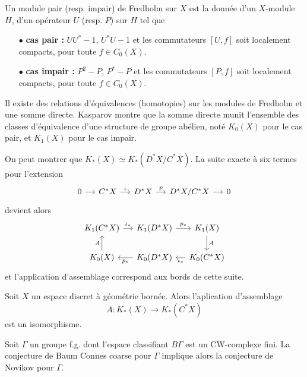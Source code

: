\documentclass{beamer}
\begin{document}
\begin{frame}
\begin{definition}
Un module pair (resp. impair) de Fredholm sur $X$ est la donnée d'un $X$-module $H$, d'un opérateur $U$ (resp. $P$) sur $H$ tel que
\begin{itemize}
\item[$\bullet$] \textbf{cas pair :} $UU^*-1$, $U^*U-1$ et les commutateurs $[U,f]$ soit localement compacts, pour toute $f\in C_0(X)$.
\item[$\bullet$] \textbf{cas impair :} $P^2-P$, $P^*-P$ et les commutateurs $[P,f]$ soit localement compacts, pour toute $f\in C_0(X)$.
\end{itemize}
Il existe des relations d'équivalences (homotopies) sur les modules de Fredholm et une somme directe. Kasparov montre que la somme directe munit l'ensemble des classes d'équivalence d'une structure de groupe abélien, noté $K_0(X)$ pour le cas pair, et $K_1(X)$ pour le cas impair. 
\end{definition}
\end{frame}

\begin{frame}
On peut montrer que $K_*(X)\simeq K_*(D^*X/C^*X)$. La suite exacte à six termes pour l'extension 
\[\begin{tikzcd}[ampersand replacement=\&,column sep = small]
0 \arrow{r} \& C^*X \arrow{r}{\iota} \& D^*X\arrow{r}{p} \& D^*X/C^*X\arrow{r} \& 0  
\end{tikzcd}\]
devient alors
\[\begin{tikzcd}[ampersand replacement=\&,column sep = small]
 K_1(C^*X)\arrow{r}{\iota_*}\& K_1(D^*X)\arrow{r}{p_*}\& K_1(X)\arrow{d}{A}\\
K_0(X)\arrow{u}{A}\& K_0(D^*X)\arrow{l}{p_*}\& K_0(C^*X)\arrow{l}{\iota_*}
\end{tikzcd}\]
et l'application d'assemblage correspond aux bords de cette suite.
\end{frame}

\begin{frame}
\begin{conj} Soit $X$ un espace discret à géométrie bornée. Alors l'aplication d'assemblage 
\[A : K_*(X)\rightarrow K_*(C^*X)\]
est un isomorphisme.
\end{conj}
\begin{thm} Soit $\Gamma$ un groupe f.g. dont l'espace classifiant $B\Gamma$ est un CW-complexe fini. La conjecture de Baum Connes coarse pour $\Gamma$ implique alors la conjecture de Novikov pour $\Gamma$. 
\end{thm}
\end{frame}
\end{document}
